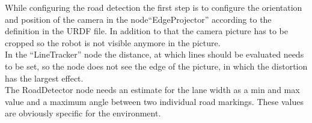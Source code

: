 While configuring the road detection the first step is to configure the orientation and position of the camera in the node``EdgeProjector'' according to the definition in the URDF file. In addition to that the camera picture has to be cropped so the robot is not visible anymore in the picture.\\

In the ``LineTracker'' node the distance, at which lines should be evaluated needs to be set, so the node does not see the edge of the picture, in which the distortion has the largest effect.\\


The RoadDetector node needs an estimate for the lane width as a min and max value and a maximum angle between two individual road markings. These values are obviously specific for the environment.\\



